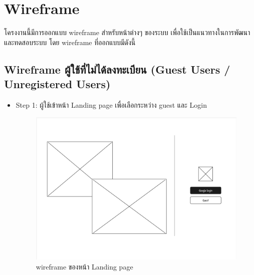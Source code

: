 \section{Wireframe}
\begin{mypara}
    \indent โครงงานนี้มีการออกแบบ wireframe สำหรับหน้าต่างๆ ของระบบ 
    เพื่อใช้เป็นแนวทางในการพัฒนาและทดสอบระบบ โดย wireframe ที่ออกแบบมีดังนี้

\subsection{Wireframe ผู้ใช้ที่ไม่ได้ลงทะเบียน (Guest Users / Unregistered Users)}
\begin{itemize}
    \item Step 1: ผู้ใช้เข้าหน้า Landing page เพื่อเลือกระหว่าง guest และ Login
      \begin{figure}[H]
        \centering
        \includegraphics[scale=0.4]
        {homepage.png}
        \caption{wireframe ของหน้า Landing page}
        \label{fig:WireframeHomepage}
      \end{figure}


\end{itemize}
\end{mypara}
